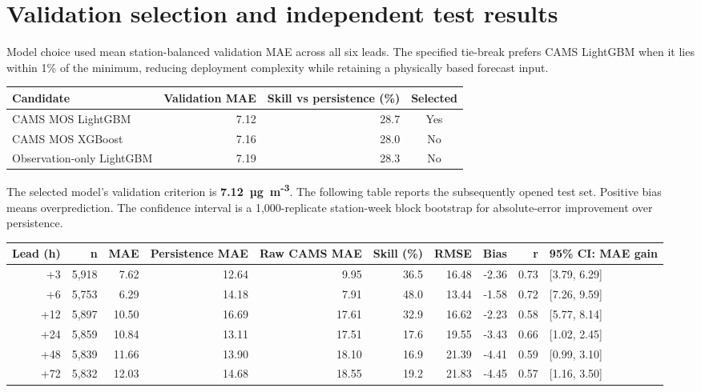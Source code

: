 \documentclass[11pt,a4paper]{article}
\begin{document}
\section{Validation selection and independent test results}
Model choice used mean station-balanced validation MAE across all six leads. The specified tie-break prefers CAMS LightGBM when it lies within 1\% of the minimum, reducing deployment complexity while retaining a physically based forecast input.

\begin{table}[H]
\centering
\small
\begin{adjustbox}{max width=\linewidth}
\begin{tabular}{lrrc}
\toprule
Candidate & Validation MAE & Skill vs persistence (\%) & Selected \\
\midrule
CAMS MOS LightGBM & 7.12 & 28.7 & Yes \\
CAMS MOS XGBoost & 7.16 & 28.0 & No \\
Observation-only LightGBM & 7.19 & 28.3 & No \\
\bottomrule
\end{tabular}
\end{adjustbox}
\end{table}

The selected model's validation criterion is \textbf{7.12~µg~m\textsuperscript{-3}}. The following table reports the subsequently opened test set. Positive bias means overprediction. The confidence interval is a 1,000-replicate station-week block bootstrap for absolute-error improvement over persistence.

\begin{table}[H]
\centering
\small
\begin{adjustbox}{max width=\linewidth}
\begin{tabular}{rrrrrrrrrl}
\toprule
Lead (h) & n & MAE & Persistence MAE & Raw CAMS MAE & Skill (\%) & RMSE & Bias & r & 95\% CI: MAE gain \\
\midrule
+3 & 5,918 & 7.62 & 12.64 & 9.95 & 36.5 & 16.48 & -2.36 & 0.73 & [3.79, 6.29] \\
+6 & 5,753 & 6.29 & 14.18 & 7.91 & 48.0 & 13.44 & -1.58 & 0.72 & [7.26, 9.59] \\
+12 & 5,897 & 10.50 & 16.69 & 17.61 & 32.9 & 16.62 & -2.23 & 0.58 & [5.77, 8.14] \\
+24 & 5,859 & 10.84 & 13.11 & 17.51 & 17.6 & 19.55 & -3.43 & 0.66 & [1.02, 2.45] \\
+48 & 5,839 & 11.66 & 13.90 & 18.10 & 16.9 & 21.39 & -4.41 & 0.59 & [0.99, 3.10] \\
+72 & 5,832 & 12.03 & 14.68 & 18.55 & 19.2 & 21.83 & -4.45 & 0.57 & [1.16, 3.50] \\
\bottomrule
\end{tabular}
\end{adjustbox}
\end{table}
\end{document}
